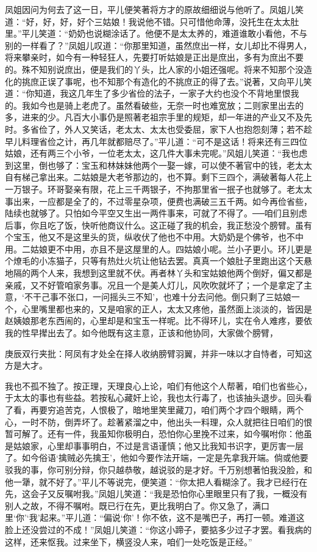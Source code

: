 \begin{parag}


    凤姐因问为何去了这一日，平儿便笑著将方才的原故细细说与他听了。凤姐儿笑道：“好，好，好，好个三姑娘！我说他不错。只可惜他命薄，没托生在太太肚里。”平儿笑道：“奶奶也说糊涂话了。他便不是太太养的，难道谁敢小看他，不与别的一样看了？”凤姐儿叹道：“你那里知道，虽然庶出一样，女儿却比不得男人，将来攀亲时，如今有一种轻狂人，先要打听姑娘是正出是庶出，多有为庶出不要的。殊不知别说庶出，便是我们的丫头，比人家的小姐还强呢。将来不知那个没造化的挑庶正误了事呢，也不知那个有造化的不挑庶正的得了去。”说著，又向平儿笑道：“你知道，我这几年生了多少省俭的法子，一家子大约也没个不背地里恨我的。我如今也是骑上老虎了。虽然看破些，无奈一时也难宽放；二则家里出去的多，进来的少。凡百大小事仍是照著老祖宗手里的规矩，却一年进的产业又不及先时。多省俭了，外人又笑话，老太太、太太也受委屈，家下人也抱怨刻薄；若不趁早儿料理省俭之计，再几年就都赔尽了。”平儿道：“可不是这话！将来还有三四位姑娘，还有两三个小爷，一位老太太，这几件大事未完呢。”风姐儿笑道：“我也虑到这里，倒也够了：宝玉和林妹妹他两个一娶一嫁，可以使不著官中的钱，老太太自有梯己拿出来。二姑娘是大老爷那边的，也不算。剩下三四个，满破著每人花上一万银子。环哥娶亲有限，花上三千两银子，不拘那里省一抿子也就够了。老太太事出来，一应都是全了的，不过零星杂项，便费也满破三五千两。如今再俭省些，陆续也就够了。只怕如今平空又生出一两件事来，可就了不得了。──咱们且别虑后事，你且吃了饭，快听他商议什么。这正碰了我的机会，我正愁没个膀臂。虽有个宝玉，他又不是这里头的货，纵收伏了他也不中用。大奶奶是个佛爷，也不中用。二姑娘更不中用，亦且不是这屋里的人。四姑娘小呢。兰小子更小。环儿更是个燎毛的小冻猫子，只等有热灶火坑让他钻去罢。真真一个娘肚子里跑出这个天悬地隔的两个人来，我想到这里就不伏。再者林丫头和宝姑娘他两个倒好，偏又都是亲戚，又不好管咱家务事。况且一个是美人灯儿，风吹吹就坏了；一个是拿定了主意，‘不干己事不张口，一问摇头三不知’，也难十分去问他。倒只剩了三姑娘一个，心里嘴里都也来的，又是咱家的正人，太太又疼他，虽然面上淡淡的，皆因是赵姨娘那老东西闹的，心里却是和宝玉一样呢。比不得环儿，实在令人难疼，要依我的性早撵出去了。如今他既有这主意，正该和他协同，大家做个膀臂，\begin{note}庚辰双行夹批：阿凤有才处全在择人收纳膀臂羽翼，并非一味以才自恃者，可知这方是大才。\end{note}我也不孤不独了。按正理，天理良心上论，咱们有他这个人帮著，咱们也省些心，于太太的事也有些益。若按私心藏奸上论，我也太行毒了，也该抽头退步。回头看了看，再要穷追苦克，人恨极了，暗地里笑里藏刀，咱们两个才四个眼睛，两个心，一时不防，倒弄坏了。趁著紧溜之中，他出头一料理，众人就把往日咱们的恨暂可解了。还有一件，我虽知你极明白，恐怕你心里挽不过来，如今嘱咐你：他虽是姑娘家，心里却事事明白，不过是言语谨慎；他又比我知书识字，更厉害一层了。如今俗语‘擒贼必先擒王’，他如今要作法开端，一定是先拿我开端。倘或他要驳我的事，你可别分辩，你只越恭敬，越说驳的是才好。千万别想著怕我没脸，和他一犟，就不好了。”平儿不等说完，便笑道：“你太把人看糊涂了。我才已经行在先，这会子又反嘱咐我。”凤姐儿笑道：“我是恐怕你心里眼里只有了我，一概没有别人之故，不得不嘱咐。既已行在先，更比我明白了。你又急了，满口里‘你’‘我’起来。”平儿道：“偏说‘你’！你不依，这不是嘴巴子，再打一顿。难道这脸上还没尝过的不成！”凤姐儿笑道：“你这小蹄子，要掂多少过子才罢。看我病的这样，还来怄我。过来坐下，横竖没人来，咱们一处吃饭是正经。”
\end{parag}


